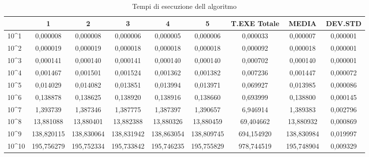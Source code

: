 \documentclass[12pt,a4paper]{report}
\begin{document}
\begin{table}[ht]
\begin{tabular}{| l | c | c | c | c | c | c | c  | c |}
\hline
             & 1          & 2          & 3          & 4          & 5          & T.EXE Totale & MEDIA      & DEV.STD  \\ \hline
10\textasciicircum{}1  & 0,000008   & 0,000008   & 0,000006   & 0,000005   & 0,000006   & 0,000033     & 0,000007   & 0,000001 \\ \hline
10\textasciicircum{}2  & 0,000019   & 0,000019   & 0,000018   & 0,000018   & 0,000018   & 0,000092     & 0,000018   & 0,000001 \\ \hline
10\textasciicircum{}3  & 0,000141   & 0,000140   & 0,000141   & 0,000140   & 0,000140   & 0,000702     & 0,000140   & 0,000001 \\ \hline
10\textasciicircum{}4  & 0,001467   & 0,001501   & 0,001524   & 0,001362   & 0,001382   & 0,007236     & 0,001447   & 0,000072 \\ \hline
10\textasciicircum{}5  & 0,014029   & 0,014082   & 0,013851   & 0,013994   & 0,013971   & 0,069927     & 0,013985   & 0,000086 \\ \hline
10\textasciicircum{}6  & 0,138878   & 0,138625   & 0,138920   & 0,138916   & 0,138660   & 0,693999     & 0,138800   & 0,000145 \\ \hline
10\textasciicircum{}7  & 1,393739   & 1,387346   & 1,387775   & 1,387397   & 1,390657   & 6,946914     & 1,389383   & 0,002796 \\ \hline
10\textasciicircum{}8  & 13,881088  & 13,880401  & 13,882388  & 13,880326  & 13,880459  & 69,404662    & 13,880932  & 0,000869 \\ \hline
10\textasciicircum{}9  & 138,820115 & 138,830064 & 138,831942 & 138,863054 & 138,809745 & 694,154920   & 138,830984 & 0,019997 \\ \hline
10\textasciicircum{}10 & 195,756279 & 195,752334 & 195,733842 & 195,746235 & 195,755829 & 978,744519   & 195,748904 & 0,009329 \\ \hline
\end{tabular}
\caption{Tempi di esecuzione dell algoritmo}
\label{Tab:TimeExceMCPi}
\end{table}
\end{document}
